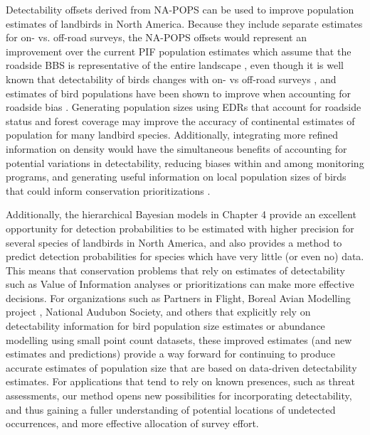 \par Detectability offsets derived from NA-POPS can be used to improve population estimates of landbirds in North America. 
Because they include separate estimates for on- vs. off-road surveys, the NA-POPS offsets would represent an improvement over the current PIF population estimates which assume that the roadside BBS is representative of the entire landscape \citep{rosenberg_partners_2016, stanton_estimating_2019}, even though it is well known that detectability of birds changes with on- vs off-road surveys \citep{sauer_first_2017, yip_sound_2017, cooke_road_2020}, and estimates of bird populations have been shown to improve when accounting for roadside bias \citep{solymos_lessons_2020}. 
Generating population sizes using EDRs that account for roadside status and forest coverage may improve the accuracy of continental estimates of population for many landbird species. 
Additionally, integrating more refined information on density would have the simultaneous benefits of accounting for potential variations in detectability, reducing biases within and among monitoring programs, and generating useful information on local population sizes of birds that could inform conservation prioritizations \citep{veloz_improving_2015}.

Additionally, the hierarchical Bayesian models in Chapter 4 provide an excellent opportunity for detection probabilities to be estimated with higher precision for several species of landbirds in North America, and also provides a method to predict detection probabilities for species which have very little (or even no) data. 
This means that conservation problems that rely on estimates of detectability such as Value of Information analyses \citep{canessa_when_2015, bennett_when_2018} or prioritizations \citep{hanson_systematic_2024} can make more effective decisions.
For organizations such as Partners in Flight, Boreal Avian Modelling project \citep{cumming_toward_2010}, National Audubon Society, and others that explicitly rely on detectability information for bird population size estimates or abundance modelling using small point count datasets, these improved estimates (and new estimates and predictions) provide a way forward for continuing to produce accurate estimates of population size that are based on data-driven detectability estimates.
For applications that tend to rely on known presences, such as threat assessments, our method opens new possibilities for incorporating detectability, and thus gaining a fuller understanding of  potential locations of undetected occurrences, and more effective allocation of survey effort.

